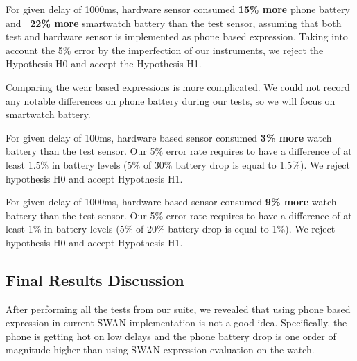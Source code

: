 For given delay of 1000ms, hardware sensor consumed \textbf{15\% more} phone battery and \textbf{~22\% more } smartwatch battery than the test sensor, assuming that both test and hardware
sensor is implemented as phone based expression.
Taking into account the 5\% error by the imperfection of our instruments, we reject the Hypothesis H0 and accept the Hypothesis H1.

Comparing the wear based expressions is more complicated. We could not record any notable differences on phone battery during our tests, so we will focus on smartwatch battery.

For given delay of 100ms,  hardware based sensor consumed \textbf{3\% more} watch battery than the test sensor.
Our 5\% error rate requires to have a difference of at least 1.5\% in battery levels (5\% of 30\% battery drop is equal to 1.5\%). We
reject hypothesis H0 and accept Hypothesis H1.

For given delay of 1000ms,  hardware based sensor consumed \textbf{9\% more} watch battery than the test sensor.
Our 5\% error rate requires to have a difference of at least 1\% in battery levels (5\% of 20\% battery drop is equal to 1\%). We
reject hypothesis H0 and accept Hypothesis H1.

\subsection{Final Results Discussion}

After performing all the tests from our suite, we revealed that using phone based expression in current SWAN implementation is not a good idea.
Specifically, the phone is getting hot on low delays and the phone battery drop is one order of magnitude higher than using SWAN expression evaluation on the watch.

